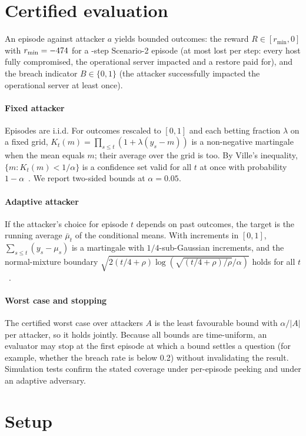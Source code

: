 \documentclass[conference,compsoc]{IEEEtran}
\begin{document}
\section{Certified evaluation}\label{sec:protocol}
An episode against attacker $a$ yields bounded outcomes: the reward $R\in[r_{\min},0]$
with $r_{\min}=-474$ for a \CgSteps-step Scenario-2 episode (at most
\CgStepBound{} lost per step: every host fully compromised, the operational server
impacted and a restore paid for), and the breach indicator $B\in\{0,1\}$ (the attacker
successfully impacted the operational server at least once).

\paragraph{Fixed attacker}
Episodes are i.i.d. For outcomes rescaled to $[0,1]$ and each betting fraction $\lambda$
on a fixed grid, $K_t(m)=\prod_{s\le t}(1+\lambda(y_s-m))$ is a non-negative martingale
when the mean equals $m$; their average over the grid is too. By Ville's inequality,
$\{m: K_t(m)<1/\alpha\}$ is a confidence set valid for all $t$ at once with probability
$1-\alpha$~\cite{waudbysmith2023betting}. We report two-sided bounds at $\alpha=0.05$.

\paragraph{Adaptive attacker}
If the attacker's choice for episode $t$ depends on past outcomes, the target is the
running average $\bar\mu_t$ of the conditional means. With increments in $[0,1]$,
$\sum_{s\le t}(y_s-\mu_s)$ is a martingale with $1/4$-sub-Gaussian increments, and the
normal-mixture boundary $\sqrt{2(t/4+\rho)\log(\sqrt{(t/4+\rho)/\rho}/\alpha)}$ holds for
all $t$~\cite{howard2021timeuniform}.

\paragraph{Worst case and stopping}
The certified worst case over attackers $A$ is the least favourable bound with
$\alpha/|A|$ per attacker, so it holds jointly. Because all bounds are time-uniform, an
evaluator may stop at the first episode at which a bound settles a question (for example,
whether the breach rate is below 0.2) without invalidating the result. Simulation tests
confirm the stated coverage under per-episode peeking and under an adaptive adversary.

\section{Setup}\label{sec:setup}
\end{document}
